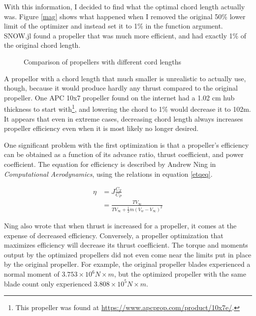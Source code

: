 \documentclass[journal ]{new-aiaa}
\begin{document}
With this information, I decided to find what the optimal chord length actually was. Figure \eqref{mag} shows what happened when I removed the original  50\% lower limit of the optimizer and instead set it to 1\% in the function argument. SNOW.jl found a propeller that was much more efficient, and had exactly 1\% of the original chord length.

\begin{figure}[H]
\centering
	
	\caption{Comparison of propellers with different cord lengths}
	\captionsetup{aboveskip=0pt,font=it}
	\label{mag}
\end{figure}

A propellor with a chord length that much smaller is unrealistic to actually use, though, because it would produce hardly any thrust compared to the original propeller. One APC 10x7 propeller found on the internet had a 1.02 cm hub thickness to start with\footnote{This propeller was found at \url{https://www.apcprop.com/product/10x7e/}.}, and lowering the chord to 1\% would decrease it to 102{\textmu}m. It appears that even in extreme cases, decreasing chord length always increases propeller efficiency even when it is most likely no longer desired.

One significant problem with the first optimization is that a propeller's efficiency can be obtained as a function of its advance ratio, thrust coefficient, and power coefficient. The equation for efficiency is described by Andrew Ning in \emph{Computational Aerodynamics}\cite{ComAer}, using the relations in equation \eqref{etqeq}.

\begin{equation}
	\begin{aligned}
	\eta & = J \frac{C_{T}}{C_{P}} \\
	& = \frac{T V_{\infty}}{T V_{\infty} + \frac{1}{2} \dot{m} (V_{w} - V_{\infty})^{2}}
	\end{aligned}
\label{etqeq}
\end{equation}

Ning also wrote that when thrust is increased for a propeller, it comes at the expense of decreased efficiency\cite{ComAer}. Conversely, a propeller optimization that maximizes efficiency will decrease its thrust coefficient. The torque and moments output by the optimized propellers did not even come near the limits put in place by the original propeller. For example, the original propeller blades experienced a normal moment of $3.753 \times 10^{6}N \times m$, but the optimized propeller with the same blade count only experienced $3.808 \times 10^{5} N \times m$.
\end{document}
